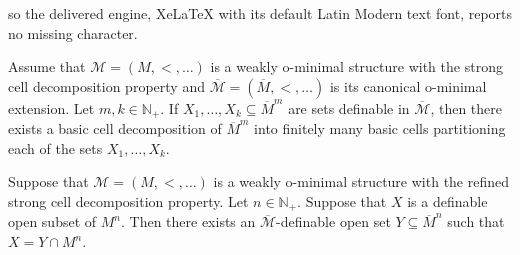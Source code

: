 \documentclass[10pt,a4paper]{amsart}
\def \M {{\mathcal M}}
\newcommand{\N}{\mathbb{N}}
\newcommand{\bN}{\mathbb N}
\newcommand{\ov}{\overline}
\begin{document}
so the delivered engine, XeLaTeX with its default Latin Modern text font, reports no missing character.
\begin{fact} \label{basic}
	Assume that $\mathcal M = (M, <, \dots)$ is a weakly o-minimal structure with the strong cell decomposition property and $\ov{\mathcal M} = (\ov{M}, <, \dots)$ is its canonical o-minimal extension.
	Let $m, k \in \N_{+}$.
	If $X_1, \dots, X_k \subseteq \ov{M}^m$ are sets definable in $\ov{\M}$,
	then there exists a basic cell decomposition of $\ov{M}^m$ into finitely many basic cells partitioning each of the sets $X_1, \ldots, X_k$.
\end{fact}

\begin{proposition} \label{open}
Suppose that $\mathcal M = (M, <, \ldots)$ is a weakly o-minimal structure with the refined strong cell decomposition property.
Let $n \in \bN_{+}$.
Suppose that  $X$ is a definable open subset of $M^n$.
Then there exists an $\overline{\M}$-definable open set $Y \subseteq \overline{M}^n$ such that
$X = Y \cap M^n$.
\end{proposition}
\end{document}
